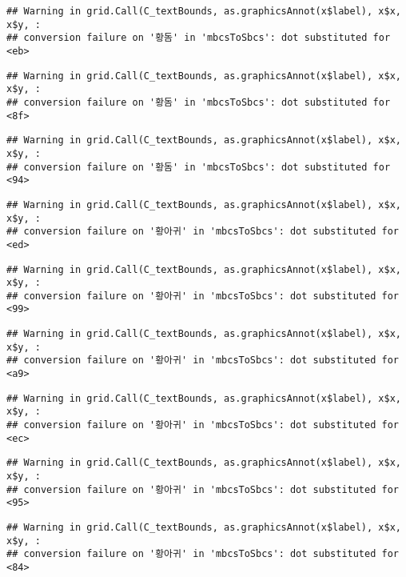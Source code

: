 \documentclass[
]{article}
\begin{document}
\begin{verbatim}
## Warning in grid.Call(C_textBounds, as.graphicsAnnot(x$label), x$x, x$y, :
## conversion failure on '황돔' in 'mbcsToSbcs': dot substituted for <eb>
\end{verbatim}

\begin{verbatim}
## Warning in grid.Call(C_textBounds, as.graphicsAnnot(x$label), x$x, x$y, :
## conversion failure on '황돔' in 'mbcsToSbcs': dot substituted for <8f>
\end{verbatim}

\begin{verbatim}
## Warning in grid.Call(C_textBounds, as.graphicsAnnot(x$label), x$x, x$y, :
## conversion failure on '황돔' in 'mbcsToSbcs': dot substituted for <94>
\end{verbatim}

\begin{verbatim}
## Warning in grid.Call(C_textBounds, as.graphicsAnnot(x$label), x$x, x$y, :
## conversion failure on '황아귀' in 'mbcsToSbcs': dot substituted for <ed>
\end{verbatim}

\begin{verbatim}
## Warning in grid.Call(C_textBounds, as.graphicsAnnot(x$label), x$x, x$y, :
## conversion failure on '황아귀' in 'mbcsToSbcs': dot substituted for <99>
\end{verbatim}

\begin{verbatim}
## Warning in grid.Call(C_textBounds, as.graphicsAnnot(x$label), x$x, x$y, :
## conversion failure on '황아귀' in 'mbcsToSbcs': dot substituted for <a9>
\end{verbatim}

\begin{verbatim}
## Warning in grid.Call(C_textBounds, as.graphicsAnnot(x$label), x$x, x$y, :
## conversion failure on '황아귀' in 'mbcsToSbcs': dot substituted for <ec>
\end{verbatim}

\begin{verbatim}
## Warning in grid.Call(C_textBounds, as.graphicsAnnot(x$label), x$x, x$y, :
## conversion failure on '황아귀' in 'mbcsToSbcs': dot substituted for <95>
\end{verbatim}

\begin{verbatim}
## Warning in grid.Call(C_textBounds, as.graphicsAnnot(x$label), x$x, x$y, :
## conversion failure on '황아귀' in 'mbcsToSbcs': dot substituted for <84>
\end{verbatim}
\end{document}
